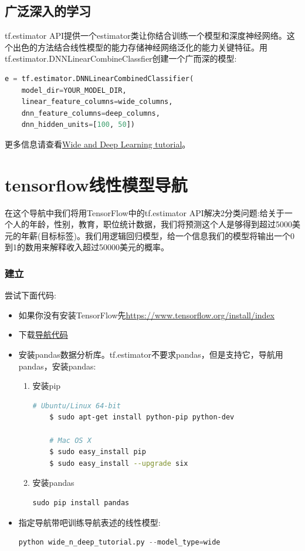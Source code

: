 \subsection{广泛深入的学习}
tf.estimator API提供一个estimator类让你结合训练一个模型和深度神经网络。这个出色的方法结合线性模型的能力存储神经网络泛化的能力关键特征。用tf.estimator.DNNLinearCombineClassfier创建一个广而深的模型:
\begin{lstlisting}[language=Python]
e = tf.estimator.DNNLinearCombinedClassifier(
    model_dir=YOUR_MODEL_DIR,
    linear_feature_columns=wide_columns,
    dnn_feature_columns=deep_columns,
    dnn_hidden_units=[100, 50])
\end{lstlisting}
更多信息请查看\href{https://www.tensorflow.org/tutorials/wide_and_deep}{Wide and Deep Learning tutorial}。
\section{tensorflow线性模型导航}
在这个导航中我们将用TensorFlow中的tf.estimator API解决2分类问题:给关于一个人的年龄，性别，教育，职位统计数据，我们将预测这个人是够得到超过5000美元的年薪(目标标签)。我们用逻辑回归模型，给一个信息我们的模型将输出一个0到1的数用来解释收入超过50000美元的概率。
\subsubsection{建立}
尝试下面代码:
\begin{itemize}
  \item 如果你没有安装TensorFlow先\href{安装}{https://www.tensorflow.org/install/index}
  \item 下载\href{https://www.github.com/tensorflow/tensorflow/blob/r1.3/tensorflow/examples/learn/wide_n_deep_tutorial.py}{导航代码}
  \item 安装pandas数据分析库。tf.estimator不要求pandas，但是支持它，导航用pandas，安装pandas:
  \begin{enumerate}
    \item  安装pip
    \begin{lstlisting}[language=Bash]
    # Ubuntu/Linux 64-bit
    $ sudo apt-get install python-pip python-dev

    # Mac OS X
    $ sudo easy_install pip
    $ sudo easy_install --upgrade six
    \end{lstlisting}
    \item 安装pandas
    \begin{lstlisting}[language=Python]
    sudo pip install pandas
    \end{lstlisting}
  \end{enumerate}
  \item 指定导航带吧训练导航表述的线性模型:
  \begin{lstlisting}[language=Python]
  python wide_n_deep_tutorial.py --model_type=wide
  \end{lstlisting}
\end{itemize}
